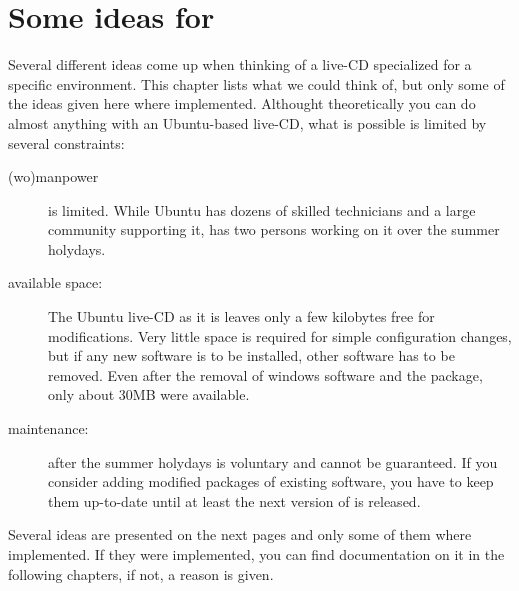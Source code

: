 
\chapter{Some ideas for \tunix}
Several different ideas come up when thinking of a live-CD specialized for a
specific environment. This chapter lists what we could think of, but only some
of the ideas given here where implemented. Althought theoretically you can do
almost anything with an Ubuntu-based live-CD, what is possible is limited by
several constraints:
\begin{description}
 \item[(wo)manpower] is limited. While Ubuntu has dozens of skilled technicians and
   a large community supporting it, \tunix has two persons working on it over
   the summer holydays.
 \item[available space:] The Ubuntu live-CD as it is leaves only a few kilobytes
   free for modifications. Very little space is required for simple
   configuration changes, but if any new software is to be installed, other
   software has to be removed. Even after the removal of windows software and the
    package, only about 30MB were available.
 \item[maintenance:] after the summer holydays is voluntary and cannot be
   guaranteed. If you consider adding modified packages of existing software,
   you have to keep them up-to-date until at least the next version of \tunix is
   released.
\end{description}
Several ideas are presented on the next pages and only some of them where
implemented. If they were implemented, you can find documentation on it in the
following chapters, if not, a reason is given.
